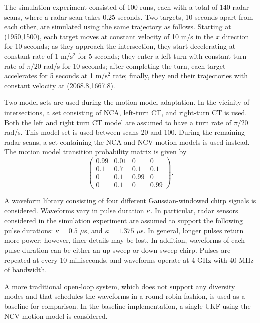 \documentclass[times]{asjcauth}
\begin{document}
The simulation experiment consisted of 100 runs, each with a total of 140 radar scans, where a radar scan takes 0.25 seconds. Two targets, 10 seconds apart from each other, are simulated using the same trajectory as follows. Starting at (1950,1500), each target moves at constant velocity of 10 m/s in the $x$ direction for 10 seconds; as they approach the intersection, they start decelerating at constant rate of 1 m/$\text{s}^{2}$ for 5 seconds; they enter a left turn with constant turn rate of $\pi/20$ rad/s for 10 seconds; after completing the turn, each target accelerates for 5 seconds at 1 m/$\text{s}^{2}$ rate; finally, they end their trajectories with constant velocity at (2068.8,1667.8).

Two model sets are used during the motion model adaptation. In the vicinity of intersections, a set consisting of NCA, left-turn CT, and right-turn CT is used. Both the left and right turn CT model are assumed to have a turn rate of $\pi/20$ rad/s. This model set is used between scans 20 and 100. During the remaining radar scans, a set containing the NCA and NCV motion models is used instead. The motion model transition probability matrix is given by
\begin{equation*}
\left(
        \begin{array}{cccc}
          0.99 & 0.01 & 0 & 0 \\
          0.1 & 0.7 & 0.1 & 0.1 \\
          0 & 0.1 & 0.99 & 0 \\
          0 & 0.1 & 0 & 0.99
        \end{array}
      \right).
\end{equation*}

A waveform library consisting of four different Gaussian-windowed chirp signals is considered. Waveforms vary in pulse duration $\kappa$. In particular, radar sensors considered in the simulation experiment are assumed to support the following pulse durations: $\kappa = 0.5 $ $\mu$s, and $\kappa = 1.375$ $\mu$s. In general, longer pulses return more power; however, finer details may be lost. In addition, waveforms of each pulse duration can be either an up-sweep or down-sweep chirp. Pulses are repeated at every 10 milliseconds, and waveforms operate at 4 GHz with 40 MHz of bandwidth.

A more traditional open-loop system, which does not support any diversity modes and that schedules the waveforms in a round-robin fashion, is used as a baseline for comparison. In the baseline implementation, a single UKF using the NCV motion model is considered.
\end{document}
